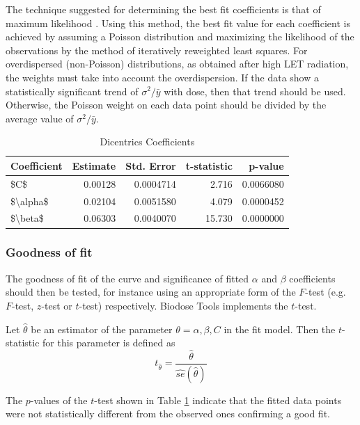 \documentclass[]{scrartcl}
\begin{document}
The technique suggested for determining the best fit coefficients is that of maximum likelihood \citep[104;][]{Merkle1983}. Using this method, the best fit value for each coefficient is achieved by assuming a Poisson distribution and maximizing the likelihood of the observations by the method of iteratively reweighted least squares. For overdispersed (non-Poisson) distributions, as obtained after high LET radiation, the weights must take into account the overdispersion. If the data show a statistically significant trend of \(\sigma^{2}/\bar{y}\) with dose, then that trend should be used. Otherwise, the Poisson weight on each data point should be divided by the average value of \(\sigma^{2}/\bar{y}\).

\begin{table}

\caption{\label{tab:dic-coeffs}Dicentrics Coefficients}
\centering
\begin{tabular}[t]{lrrrr}
\toprule
Coefficient & Estimate & Std. Error & t-statistic & p-value\\
\midrule
\$C\$ & 0.00128 & 0.0004714 & 2.716 & 0.0066080\\
\$\textbackslash{}alpha\$ & 0.02104 & 0.0051580 & 4.079 & 0.0000452\\
\$\textbackslash{}beta\$ & 0.06303 & 0.0040070 & 15.730 & 0.0000000\\
\bottomrule
\end{tabular}
\end{table}

\hypertarget{goodness-of-fit}{%
\subsubsection{Goodness of fit}\label{goodness-of-fit}}

The goodness of fit of the curve and significance of fitted \(\alpha\) and \(\beta\) coefficients should then be tested, for instance using an appropriate form of the \(F\)-test (e.g.~\(F\)-test, \(z\)-test or \(t\)-test) respectively. Biodose Tools implements the \(t\)-test.

Let \(\hat{\theta}\) be an estimator of the parameter \(\theta = \alpha, \beta, C\) in the fit model. Then the \(t\)-statistic for this parameter is defined as
\begin{equation} 
  t_{\hat{\theta}} = \frac{\hat{\theta}}{\widehat{se}(\hat{\theta})}
  \label{eq:t-test}
\end{equation}

The \(p\)-values of the \(t\)-test shown in Table \ref{tab:dic-coeffs} indicate that the fitted data points were not statistically different from the observed ones confirming a good fit.
\end{document}
